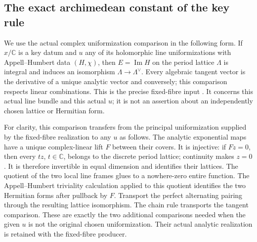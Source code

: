 \subsection{The exact archimedean constant of the key rule}
\label{subsec:ftb-key-archimedean-constant}

We use the actual complex uniformization comparison in the following
form.  If \(x/\mathbb C\) is a key datum and \(u\) any of its
holomorphic line uniformizations with Appell--Humbert data
\((H,\chi)\), then \(E=\operatorname{Im}H\) on the period lattice
\(\Lambda\) is integral and induces an isomorphism
\(\Lambda\to\Lambda^\vee\).
Every algebraic tangent vector is the derivative of a unique
analytic vector and conversely; this comparison respects linear
combinations.
This is the precise fixed-fibre input
.
It concerns this actual line bundle and this actual \(u\);
it is not an assertion about an independently chosen lattice
or Hermitian form.

For clarity, this comparison transfers from the principal
uniformization supplied by the fixed-fibre realization to any
\(u\) as follows.
The analytic exponential maps have a unique complex-linear lift
\(F\) between their covers.
It is injective: if \(Fz=0\), then every \(tz\), \(t\in\mathbb C\),
belongs to the discrete period lattice; continuity makes \(z=0\).
It is therefore invertible in equal dimension and identifies
their lattices.
The quotient of the two local line frames glues to a nowhere-zero
entire function.
The Appell--Humbert triviality calculation applied to this quotient
identifies the two Hermitian forms after pullback by \(F\).
Transport the perfect alternating pairing through the resulting
lattice isomorphism.
The chain rule transports the tangent comparison.
These are exactly the two additional comparisons needed when
the given \(u\) is not the original chosen uniformization.
Their actual analytic realization is retained with the
fixed-fibre producer.

